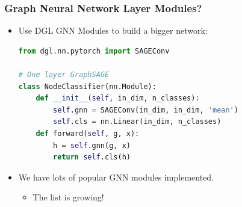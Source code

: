 \documentclass[10pt,aspectratio=169]{beamer}
\begin{document}
	\begin{frame}[fragile]
		\frametitle{Graph Neural Network Layer Modules?}
		\begin{itemize}
			\item Use DGL GNN Modules to build a bigger network:
\begin{lstlisting}[language=Python]
from dgl.nn.pytorch import SAGEConv

# One layer GraphSAGE
class NodeClassifier(nn.Module):
    def __init__(self, in_dim, n_classes):
        self.gnn = SAGEConv(in_dim, in_dim, 'mean')
        self.cls = nn.Linear(in_dim, n_classes)
    def forward(self, g, x):
        h = self.gnn(g, x)
        return self.cls(h)
\end{lstlisting}
			\item We have lots of popular GNN modules implemented.
			\begin{itemize}
				\item The list is growing!
			\end{itemize}
		\end{itemize}
	\end{frame}
	
\end{document}
